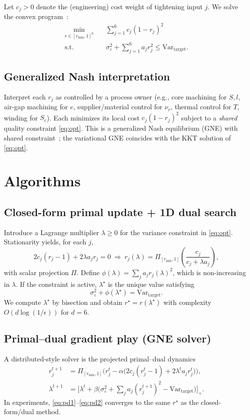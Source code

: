 \documentclass[conference]{IEEEtran}
\begin{document}
Let $c_j>0$ denote the (engineering) cost weight of tightening input $j$. We solve the convex program~\cite{boyd}:
\begin{align}
\min_{r\in[r_{\min},1]^6}\quad & \sum_{j=1}^6 c_j(1-r_j)^2 \label{eq:opt}\\
\text{s.t.}\quad & \sigma_\varepsilon^2 + \sum_{j=1}^6 a_j r_j^2 \le \mathrm{Var}_{\text{target}}. \nonumber
\end{align}

\subsection{Generalized Nash interpretation}
Interpret each $r_j$ as controlled by a process owner (e.g., core machining for $S,l$, air-gap machining for $e$, supplier/material control for $\nu_r$, thermal control for $T$, winding for $S_c$). Each minimizes its local cost $c_j(1-r_j)^2$ subject to a \emph{shared} quality constraint \eqref{eq:opt}. This is a generalized Nash equilibrium (GNE) with shared constraint~\cite{facchinei}; the variational GNE coincides with the KKT solution of \eqref{eq:opt}.

\section{Algorithms}
\subsection{Closed-form primal update + 1D dual search}
Introduce a Lagrange multiplier $\lambda\ge0$ for the variance constraint in \eqref{eq:opt}. Stationarity yields, for each $j$,
\begin{equation}
2c_j(r_j-1)+2\lambda a_j r_j = 0
\ \Rightarrow\
r_j(\lambda)=\Pi_{[r_{\min},1]}\!\left(\frac{c_j}{c_j+\lambda a_j}\right),
\label{eq:r-lambda}
\end{equation}
with scalar projection $\Pi$. Define $\phi(\lambda)=\sum_j a_j r_j(\lambda)^2$, which is non-increasing in $\lambda$. If the constraint is active, $\lambda^\star$ is the unique value satisfying
\begin{equation}
\sigma_\varepsilon^2 + \phi(\lambda^\star)=\mathrm{Var}_{\text{target}}.
\end{equation}
We compute $\lambda^\star$ by bisection and obtain $r^\star=r(\lambda^\star)$ with complexity $O(d\log(1/\epsilon))$ for $d=6$.

\subsection{Primal--dual gradient play (GNE solver)}
A distributed-style solver is the projected primal--dual dynamics
\begin{align}
r_j^{t+1} &= \Pi_{[r_{\min},1]}\!\Big(r_j^t-\alpha\big(2c_j(r_j^t-1)+2\lambda^t a_j r_j^t\big)\Big),\label{eq:pd1}\\
\lambda^{t+1} &= \Big[\lambda^t+\beta\big(\sigma_\varepsilon^2+\sum_j a_j(r_j^{t+1})^2-\mathrm{Var}_{\text{target}}\big)\Big]_+.\label{eq:pd2}
\end{align}
In experiments, \eqref{eq:pd1}--\eqref{eq:pd2} converges to the same $r^\star$ as the closed-form/dual method.
\end{document}
